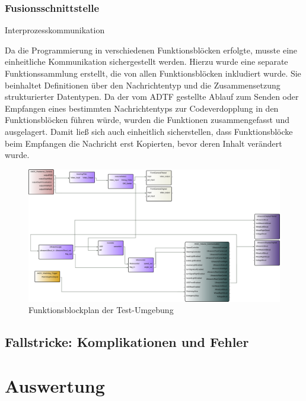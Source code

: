 \documentclass[12pt, a4paper]{scrartcl}
\begin{document}
\subsubsection{Fusionsschnittstelle}
Interprozesskommunikation

Da die Programmierung in verschiedenen Funktionsblöcken erfolgte, musste eine einheitliche Kommunikation sichergestellt werden. Hierzu wurde eine separate Funktionssammlung erstellt, die von allen Funktionsblöcken inkludiert wurde. Sie beinhaltet Definitionen über den Nachrichtentyp und die Zusammensetzung strukturierter Datentypen. Da der vom ADTF gestellte Ablauf zum Senden oder Empfangen eines bestimmten Nachrichtentyps zur Codeverdopplung in den Funktionsblöcken führen würde, wurden die Funktionen zusammengefasst und ausgelagert. Damit ließ sich auch einheitlich sicherstellen, dass Funktionsblöcke beim Empfangen die Nachricht erst Kopierten, bevor deren Inhalt verändert wurde.

\begin{figure}[ht]
	\centering
	\includegraphics[width=\textwidth, height=\textheight, keepaspectratio]{Bilder/Funktionsblockplan.png}
	\caption{Funktionsblockplan der Test-Umgebung}
	\label{img:funktionsblockplan}
\end{figure}


\subsection{Fallstricke: Komplikationen und Fehler}


\newpage
\section{Auswertung}
\end{document}

